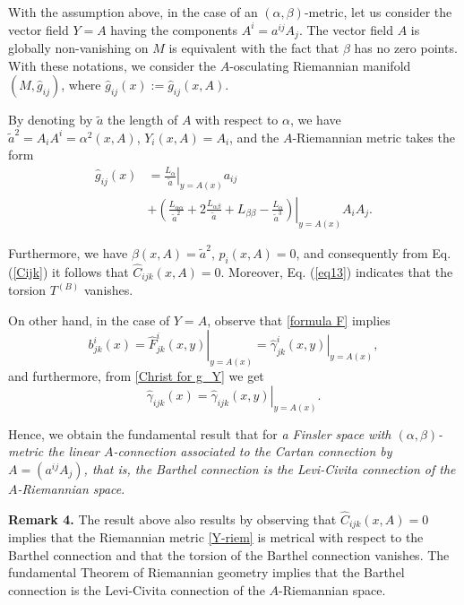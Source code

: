 \documentclass[aps,superscriptaddress, showpacs,preprintnumbers, superscriptaddress, nofootinbibt,twocolumn]{revtex4-2}
\begin{document}
With the assumption above, in the case of an
$(\alpha,\beta)$-metric, let us consider the vector field $Y=A$
having the components $A^{i}=a^{ij}A_{j}$. The vector field $A$ is globally non-vanishing on $M$ is equivalent with the fact that $\beta $ has
no zero points. With these notations, we consider the $A$-osculating Riemannian manifold $(M,\hat{g}_{ij})$, where $\hat{g}_{ij}(x):=\hat{g}_{ij}(x,A)$.

By denoting by $\tilde{a}$
the length of $A$ with respect to $\alpha $, we have $\tilde{a}%
^{2}=A_{i}A^{i}=\alpha ^{2}\left( x,A\right) $, $Y_{i}\left( x,A\right)
=A_{i}$, and the $A$-Riemannian metric takes the form
\begin{equation}
\begin{split}
   \hat{g}_{ij}\left( x\right) & =\left.\frac{L_{\alpha }}{\tilde{a}}\right|_{y=A(x)}a_{ij}\\
   & +\left.\left(
\frac{L_{\alpha \alpha }}{\tilde{a}^{2}}+2\frac{L_{\alpha \beta }}{\tilde{a}}%
+L_{\beta \beta }-\frac{L_{\alpha }}{\tilde{a}^{3}}\right)\right|_{y=A(x)} A_{i}A_{j}.
\end{split}
\end{equation}

Furthermore, we have $\beta \left( x,A\right) =\tilde{a}^{2}$, $p_{i}\left(
x,A\right) =0$, and consequently from  Eq. (\ref{Cijk}) it follows that $%
\hat{C}_{ijk}\left( x,A\right) =0$. Moreover, Eq. (\ref{eq13}) indicates that the
torsion $T^{(B)}$ vanishes.

On other hand, in the case of $Y=A$, observe that \eqref{formula F} implies
\begin{equation*}
     b^i_{jk}(x)=\left.\hat{F}^i_{jk}(x,y)\right|_{y=A(x)}=\left.\hat{\gamma}^i_{jk}(x,y)\right|_{y=A(x)},
\end{equation*}
and furthermore, from \eqref{Christ for g_Y} we get
$$
\hat{\gamma}_{ijk}(x)=\left.\hat{\gamma}_{ijk}(x,y)\right|_{y=A(x)}.
$$

Hence, we obtain the fundamental result that for {\it a
Finsler space with $(\alpha ,\beta )$-metric the linear $A$-connection
associated to the Cartan connection by $A=(a^{ij}A_{j})$, that is, the Barthel
connection is the Levi-Civita connection of the $A$-Riemannian space}.

{\bf Remark 4.} The result above also results by observing that $
\hat{C}_{ijk}\left( x,A\right) =0$ implies that the Riemannian metric \eqref{Y-riem} is metrical with respect to the Barthel connection and that the torsion of the Barthel connection vanishes. The fundamental Theorem of Riemannian geometry implies that  the Barthel
connection is the Levi-Civita connection of the $A$-Riemannian space.
\end{document}
